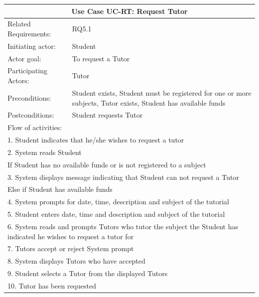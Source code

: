 \documentclass[12pt]{article}
\begin{document}
{\begin{tabular}{| l | p{10cm}| }
			\hline\multicolumn{2}{|c|}{ \textbf{Use Case UC-RT: Request Tutor}} \\ \hline
			Related Requirements: & RQ5.1\\ \hline
			Initiating actor: & Student\\ \hline
			Actor goal: & To request a Tutor\\ \hline
			Participating Actors: & Tutor\\ \hline
			Preconditions: & Student exists, Student must be registered for one or more subjects, Tutor exists, Student has available funds\\ \hline
			Postconditions: & Student requests Tutor\\ \hline
			\multicolumn{2}{|l|}{Flow of activities:}\\ \hline
			\multicolumn{2}{|p{15cm}|}{1. Student indicates that he/she wishes to request a tutor}\\
			\multicolumn{2}{|p{15cm}|}{2. System reads Student}\\
			\multicolumn{2}{|p{15cm}|}{If Student has no available funds or is not registered to a subject}\\
			\multicolumn{2}{|p{15cm}|}{3. System displays message indicating that Student can not request a Tutor}\\			
			\multicolumn{2}{|p{15cm}|}{Else if Student has available funds }	\\		
			\multicolumn{2}{|l|}{4. System prompts for date, time, description and subject of the tutorial}\\
			\multicolumn{2}{|l|}{5. Student enters date, time and description and subject of the tutorial}\\
			\multicolumn{2}{|p{15cm}|}{6. System reads and prompts Tutors who tutor the subject the Student has indicated he wishes to request a tutor for}\\
			\multicolumn{2}{|l|}{7. Tutors accept or reject System prompt}\\
			\multicolumn{2}{|l|}{8. System displays Tutors who have accepted}\\
			\multicolumn{2}{|l|}{9. Student selects a Tutor from the displayed Tutors}\\
			\multicolumn{2}{|l|}{10. Tutor has been requested} 
			\\ \hline		
		\end{tabular}
		
}
\end{document}
